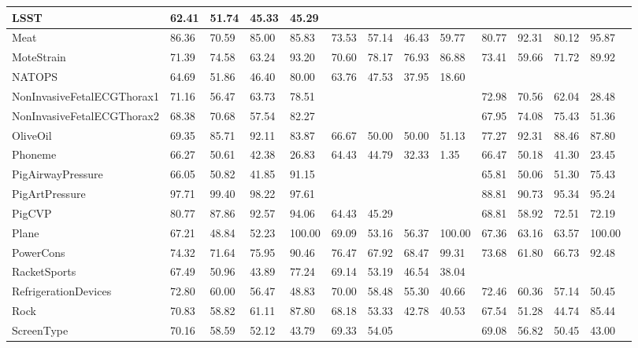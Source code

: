 \begin{landscape}
\begin{longtable}{|l|llll|llll|llll|}
      LSST & 62.41 & 51.74 & 45.33 & 45.29 &   &   &   &   &   &   &   &   \\ \hline
      Meat & 86.36 & 70.59 & 85.00 & 85.83 & 73.53 & 57.14 & 46.43 & 59.77 & 80.77 & 92.31 & 80.12 & 95.87 \\ \hline
      MoteStrain & 71.39 & 74.58 & 63.24 & 93.20 & 70.60 & 78.17 & 76.93 & 86.88 & 73.41 & 59.66 & 71.72 & 89.92 \\ \hline
      NATOPS & 64.69 & 51.86 & 46.40 & 80.00 & 63.76 & 47.53 & 37.95 & 18.60 &   &   &   &   \\ \hline
      NonInvasiveFetalECGThorax1 & 71.16 & 56.47 & 63.73 & 78.51 &   &   &   &   & 72.98 & 70.56 & 62.04 & 28.48 \\ \hline
      NonInvasiveFetalECGThorax2 & 68.38 & 70.68 & 57.54 & 82.27 &   &   &   &   & 67.95 & 74.08 & 75.43 & 51.36 \\ \hline
      OliveOil & 69.35 & 85.71 & 92.11 & 83.87 & 66.67 & 50.00 & 50.00 & 51.13 & 77.27 & 92.31 & 88.46 & 87.80 \\ \hline
      Phoneme & 66.27 & 50.61 & 42.38 & 26.83 & 64.43 & 44.79 & 32.33 & 1.35 & 66.47 & 50.18 & 41.30 & 23.45 \\ \hline
      PigAirwayPressure & 66.05 & 50.82 & 41.85 & 91.15 &   &   &   &   & 65.81 & 50.06 & 51.30 & 75.43 \\ \hline
      PigArtPressure & 97.71 & 99.40 & 98.22 & 97.61 &   &   &   &   & 88.81 & 90.73 & 95.34 & 95.24 \\ \hline
      PigCVP & 80.77 & 87.86 & 92.57 & 94.06 & 64.43 & 45.29 &   &   & 68.81 & 58.92 & 72.51 & 72.19 \\ \hline
      Plane & 67.21 & 48.84 & 52.23 & 100.00 & 69.09 & 53.16 & 56.37 & 100.00 & 67.36 & 63.16 & 63.57 & 100.00 \\ \hline
      PowerCons & 74.32 & 71.64 & 75.95 & 90.46 & 76.47 & 67.92 & 68.47 & 99.31 & 73.68 & 61.80 & 66.73 & 92.48 \\ \hline
      RacketSports & 67.49 & 50.96 & 43.89 & 77.24 & 69.14 & 53.19 & 46.54 & 38.04 &   &   &   &   \\ \hline
      RefrigerationDevices & 72.80 & 60.00 & 56.47 & 48.83 & 70.00 & 58.48 & 55.30 & 40.66 & 72.46 & 60.36 & 57.14 & 50.45 \\ \hline
      Rock & 70.83 & 58.82 & 61.11 & 87.80 & 68.18 & 53.33 & 42.78 & 40.53 & 67.54 & 51.28 & 44.74 & 85.44 \\ \hline
      ScreenType & 70.16 & 58.59 & 52.12 & 43.79 & 69.33 & 54.05 &   &   & 69.08 & 56.82 & 50.45 & 43.00 \\ \hline

\end{longtable}
\end{landscape}
